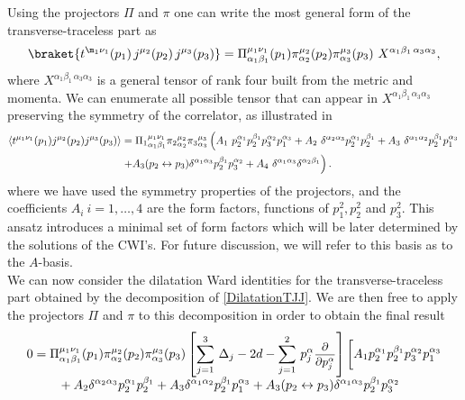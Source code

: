 \documentclass[a4paper,11pt,openright,twoside]{book}
\let\n=\nu      \let\x=\xi     \let\p=\pi      \let\r=\rho
\newcommand{\sdfrac}[2]{\mbox{\small$\displaystyle\frac{#1}{#2}$}}
\numberwithin{equation}{section}
\begin{document}
{{{Using the projectors $\Pi$ and $\pi$ one can write the most general form of the transverse-traceless part as
\begin{equation}
	{\braket{t^{\m_1\n_1}(p_1)\,j^{\mu_2}(p_2)\,j^{\mu_3}(p_3)}}=\Pi^{\mu_1\nu_1}_{\alpha_1\beta_1}(p_1)\pi^{\mu_2}_{\alpha_2}(p_2)\pi^{\mu_3}_{\alpha_3}(p_3)\,\,X^{\alpha_1\beta_1\,\alpha_3\alpha_3},
\end{equation}
where $X^{\alpha_1\beta_1\,\alpha_3\alpha_3}$ is a general tensor of rank four built from the metric and momenta. We can enumerate all possible tensor that can appear in $X^{\alpha_1\beta_1\,\alpha_3\alpha_3}$ preserving the symmetry of the 
correlator, as illustrated in \cite{Bzowski:2013sza}
\begin{align}
	\langle t^{\mu_1\nu_1}(p_1)j^{\mu_2}(p_2)j^{\mu_3}(p_3)\rangle& =
	{\Pi_1}^{\mu_1\nu_1}_{\alpha_1\beta_1}{\pi_2}^{\mu_2}_{\alpha_2}{\pi_3}^{\mu_3}_{\alpha_3}
	\left( A_1\ p_2^{\alpha_1}p_2^{\beta_1}p_3^{\alpha_2}p_1^{\alpha_3} + 
	A_2\ \delta^{\alpha_2\alpha_3} p_2^{\alpha_1}p_2^{\beta_1} + 
	A_3\ \delta^{\alpha_1\alpha_2}p_2^{\beta_1}p_1^{\alpha_3}\right. \notag\\
	& \left. + 
	A_3(p_2\leftrightarrow p_3)\delta^{\alpha_1\alpha_3}p_2^{\beta_1}p_3^{\alpha_2}
	+ A_4\  \delta^{\alpha_1\alpha_3}\delta^{\alpha_2\beta_1}\right).\label{DecompTJJ}
\end{align}
where we have used the symmetry properties of the projectors, and the coefficients $A_i\  i=1,\dots,4$ are the form factors, functions of $p_1^2, p_2^2$ and $p_3^2$. This ansatz introduces a minimal set of form factors which will be later determined by the solutions of the CWI's. For future discussion, we will refer to this basis as to the $A$-basis. \\
We can now consider the dilatation Ward identities for the transverse-traceless part obtained by the decomposition of \eqref{DilatationTJJ}. We are then free to apply the projectors $\Pi$ and $\pi$ to this decomposition in order to obtain the final result
\begin{align}
	0&=\Pi^{\mu_1\nu_1}_{\alpha_1\beta_1}(p_1)\pi^{\mu_2}_{\alpha_2}(p_2)\pi^{\mu_3}_{\alpha_3}(p_3)\left[\sum_{j=1}^3\,\Delta_j-2d-\sum_{j=1}^{2}\,p_j^\alpha\sdfrac{\partial}{\partial p_j^\alpha}\right]\bigg[ A_1 p_2^{\alpha_1}p_2^{\beta_1}p_3^{\alpha_2}p_1^{\alpha_3} \notag\\[-1ex]
	&\qquad+ 
	A_2\delta^{\alpha_2\alpha_3} p_2^{\alpha_1}p_2^{\beta_1} + 
	A_3 \delta^{\alpha_1\alpha_2}p_2^{\beta_1}p_1^{\alpha_3} + 
	A_3(p_2\leftrightarrow p_3)\delta^{\alpha_1\alpha_3}p_2^{\beta_1}p_3^{\alpha_2}

\end{align}}}}
\end{document}
